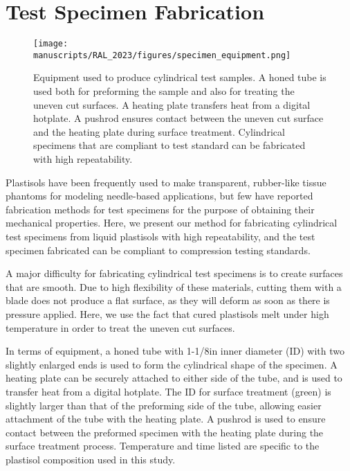 \appendix 
\makeatletter
{}
\makeatother
\renewcommand{\thechapter}{\Alph{chapter}}

\chapter{Test Specimen Fabrication} \label{chap:appendix-a}
\begin{figure}[h]
  \centering
  \texttt{[image: manuscripts/RAL\_2023/figures/specimen\_equipment.png]}
  \caption{Equipment used to produce cylindrical test samples. A honed tube is used both for preforming the sample and also for treating the uneven cut surfaces. A heating plate transfers heat from a digital hotplate. A pushrod ensures contact between the uneven cut surface and the heating plate during surface treatment. Cylindrical specimens that are compliant to test standard can be fabricated with high repeatability.}
  \label{fig:specimen_equipment}
\end{figure}

Plastisols have been frequently used to make transparent, rubber-like tissue phantoms for modeling needle-based applications, but few have reported fabrication methods for test specimens for the purpose of obtaining their mechanical properties. Here, we present our method for fabricating cylindrical test specimens from liquid plastisols with high repeatability, and the test specimen fabricated can be compliant to compression testing standards.

A major difficulty for fabricating cylindrical test specimens is to create surfaces that are smooth. Due to high flexibility of these materials, cutting them with a blade does not produce a flat surface, as they will deform as soon as there is pressure applied. Here, we use the fact that cured plastisols melt under high temperature in order to treat the uneven cut surfaces.

In terms of equipment, a honed tube with 1-1/8in inner diameter (ID) with two slightly enlarged ends is used to form the cylindrical shape of the specimen. A heating plate can be securely attached to either side of the tube, and is used to transfer heat from a digital hotplate. The ID for surface treatment (green) is slightly larger than that of the preforming side of the tube, allowing easier attachment of the tube with the heating plate. A pushrod is used to ensure contact between the preformed specimen with the heating plate during the surface treatment process. Temperature and time listed are specific to the plastisol composition used in this study.

